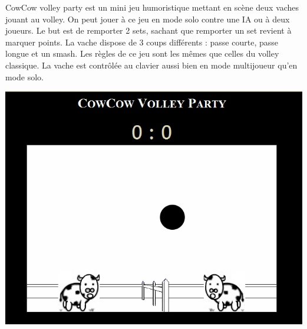 \begin{minipage}{9cm}
CowCow volley party est un mini jeu humoristique mettant en scène deux vaches jouant au volley.
On peut jouer à ce jeu en mode solo contre une IA ou à deux joueurs. 
Le but est de remporter 2 sets, sachant que remporter un set revient à marquer  points. 
La vache dispose de 3 coups différents : passe courte, passe longue et un smash.
Les règles de ce jeu sont les mêmes que celles du volley classique.
La vache est contrôlée au clavier aussi bien en mode multijoueur qu’en mode solo.
\end{minipage}
\hfill
\begin{minipage}{6cm}
 \includegraphics[width=\linewidth]{img/capturejeu_volleycowcow}
\end{minipage}


